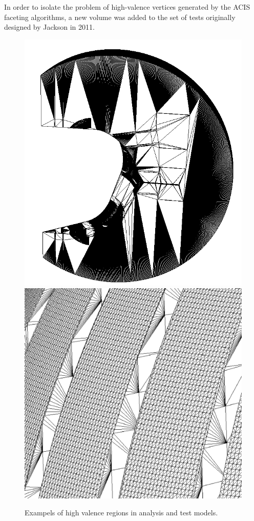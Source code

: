 \documentclass[12pt, a4paper]{article}
\begin{document}
In order to isolate the problem of high-valence vertices generated by the ACIS faceting algorithms, a new volume was added to the set of tests originally designed by Jackson in 2011.


\begin{figure}[H]
  \centering
    \includegraphics[scale=0.2]{iter_sideon.png}
    \includegraphics[scale=0.1]{ds_hv.png}
    \caption{Exampels of high valence regions in analysis and test models.}
    \label{hv_examples}
\end{figure}
\end{document}
